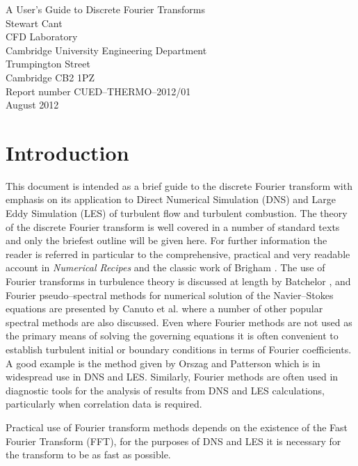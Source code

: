 \documentclass[dvips]{article}
\begin{document}
\vspace{40mm}
\begin{center}
{\Large A User's Guide to Discrete Fourier Transforms}\\[3mm]
{\large Stewart Cant}\\[3mm]
CFD Laboratory\\
Cambridge University Engineering Department\\
Trumpington Street\\
Cambridge CB2 1PZ\\[10mm]
Report number CUED--THERMO--2012/01\\
August 2012
\end{center}

\newpage
\section*{Introduction}
This document is intended as a brief guide to the discrete Fourier
transform with emphasis on its application to Direct Numerical Simulation
(DNS) and Large Eddy Simulation (LES) of
turbulent flow and turbulent combustion.  The theory of the discrete Fourier
transform is well covered in a number of standard texts and only the
briefest outline will be given here.  For further information the reader
is referred in particular to the comprehensive, practical and
very readable account in
{\it Numerical Recipes} \cite{numrec} and the classic work of Brigham
\cite{brigham}.  The use of Fourier transforms in turbulence
theory is discussed at length by Batchelor \cite{batchelor}, and Fourier
pseudo--spectral methods for numerical solution of the Navier--Stokes
equations are presented by Canuto et al. \cite{canuto} where a number of
other popular spectral methods are also discussed.  Even where Fourier
methods are not used as the primary means of solving the governing equations
it is often convenient to
establish turbulent initial or boundary conditions in terms of Fourier
coefficients.  A good example is the method given by Orszag and
Patterson \cite{orszagpatt}
which is in widespread use in DNS and LES.  Similarly, Fourier methods
are often used in diagnostic tools for the analysis of results from DNS
and LES calculations, particularly when correlation data is required.

Practical use of Fourier transform methods depends on the existence of
the Fast Fourier Transform (FFT), for the purposes of DNS and LES
it is necessary for the transform to be as fast as possible.  

 
\end{document}
